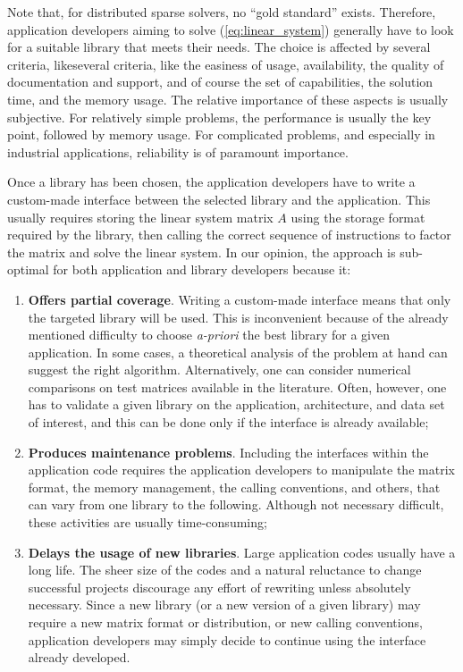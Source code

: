 \documentclass{llncs}
\begin{document}
\smallskip

Note that,
for distributed sparse solvers, no
``gold standard'' exists. Therefore, application developers aiming to solve
(\ref{eq:linear_system}) generally have to look for a suitable
library that meets their needs. The choice is affected by several criteria,
likeseveral criteria,
like the easiness of
usage, availability, the quality of documentation and support, and of course
the set of capabilities, the solution time, and the memory usage.
The relative importance of these aspects is usually subjective. For
relatively simple problems, the performance is usually the key point, followed
by memory usage. For complicated problems, and especially in industrial
applications, reliability is of paramount importance.

Once a library has been chosen, the application developers have to write a
custom-made interface between the selected library and the application. This
usually requires storing the linear system matrix $A$ using the storage format
required by the library, then calling the correct sequence of instructions to
factor the matrix and solve the linear system.  In our opinion, the approach
is sub-optimal for both application and library developers because it:
\begin{enumerate}

\item
{\bf Offers partial coverage}. Writing a custom-made interface means
that only the targeted library will be used. This is inconvenient
because of the already mentioned difficulty to choose {\it a-priori}
the best library for a given application. In some cases, a
theoretical analysis of the problem at hand can suggest the right
algorithm. Alternatively, one can consider numerical comparisons on
test matrices available in the literature.
Often, however, one has to validate a given library on the
application, architecture, and data set of interest, and this can be
done only if the interface is already available;

\item
{\bf Produces maintenance problems}. Including the interfaces within
the application code requires the application developers to
manipulate the matrix format, the memory management, the calling
conventions, and others, that can vary from one library to the
following. Although not necessary difficult, these activities are
usually time-consuming;

\item
{\bf Delays the usage of new libraries}. Large application codes
usually have a long life.  The sheer size of the codes and a natural
reluctance to change successful projects discourage any effort of
rewriting unless absolutely necessary. Since a new library (or a new
version of a given library) may require a new matrix format or
distribution, or new calling conventions, application developers may
simply decide to continue using the interface already developed.
\end{enumerate}
\end{document}
